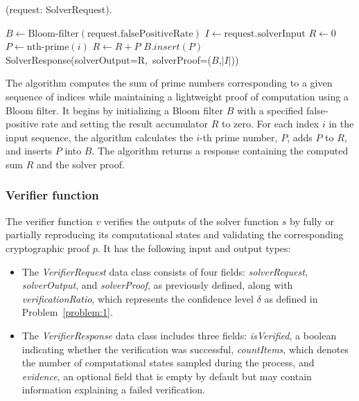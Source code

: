 \documentclass[sigconf, nonacm]{acmart}
\begin{document}
\begin{algorithm}
  \caption{(request: SolverRequest).}
  \label{alg:primesum-solver}
  \begin{algorithmic}[1]
    \STATE $B \leftarrow \mbox{Bloom-filter}(\mbox{request.falsePositiveRate})$
    \STATE $I \leftarrow \mbox{request.solverInput}$
    \STATE $R \leftarrow 0$
    \STATE $P \leftarrow \mbox{nth-prime}(i)$
    \STATE $R \leftarrow R + P$
    \STATE $B.insert(P)$
    \ENDFOR
    \RETURN \mbox{SolverResponse(solverOutput=R, solverProof=($B$,$|I|$))}
  \end{algorithmic}
\end{algorithm}

The  algorithm computes the sum of prime numbers corresponding to a given sequence of indices while maintaining a lightweight proof of computation using a Bloom filter. It begins by initializing a Bloom filter $B$ with a specified false-positive rate and setting the result accumulator $R$ to zero. For each index $i$ in the input sequence, the algorithm calculates the $i$-th prime number, $P$, adds $P$ to $R$, and inserts $P$ into $B$.
The algorithm returns a response containing the computed sum $R$ and the solver proof.

\subsubsection{Verifier function}

The verifier function $v$ verifies the outputs of the solver function $s$ by fully or partially reproducing its computational states and validating the corresponding cryptographic proof $p$.
It has the following input and output types:

\begin{itemize}
  \item The \textit{VerifierRequest} data class consists of four fields: \textit{solverRequest}, \textit{solverOutput}, and \textit{solverProof}, as previously defined, along with \textit{verificationRatio}, which represents the confidence level $\delta$ as defined in Problem~\ref{problem:1}. \item The \textit{VerifierResponse} data class includes three fields: \textit{isVerified}, a boolean indicating whether the verification was successful, \textit{countItems}, which denotes the number of computational states sampled during the process, and \textit{evidence}, an optional field that is empty by default but may contain information explaining a failed verification.
\end{itemize}
\end{document}
